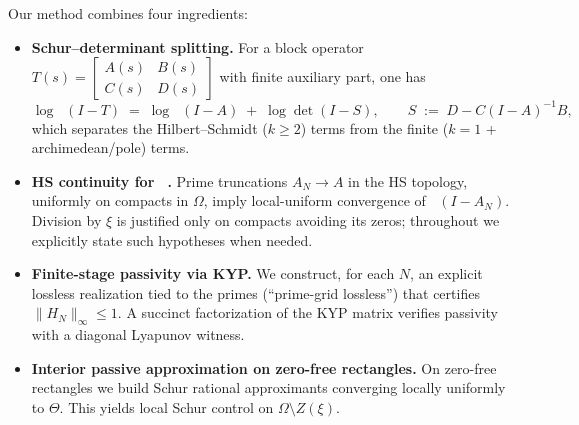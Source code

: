 \documentclass[11pt]{article}
\theoremstyle{remark}
\DeclareMathOperator{\dettwo}{det_2}
\begin{document}
Our method combines four ingredients:
\begin{itemize}
 \item \textbf{Schur--determinant splitting.} For a block operator \(T(s)=\begin{bmatrix}A(s)&B(s)\\ C(s)&D(s)\end{bmatrix}\) with finite auxiliary part, one has
 \[
  \log\dettwo(I-T)\;=\;\log\dettwo(I-A)\; +\; \log\det(I-S),\qquad S\;:=\;D-C(I-A)^{-1}B,
 \]
 which separates the Hilbert--Schmidt (\(k\ge 2\)) terms from the finite (\(k=1\) + archimedean/pole) terms.
 \item \textbf{HS continuity for \(\dettwo\).} Prime truncations \(A_N\to A\) in the HS topology, uniformly on compacts in \(\Omega\), imply local-uniform convergence of \(\dettwo(I-A_N)\). Division by \(\xi\) is justified only on compacts avoiding its zeros; throughout we explicitly state such hypotheses when needed.
 \item \textbf{Finite-stage passivity via KYP.} We construct, for each \(N\), an explicit lossless realization tied to the primes (``prime-grid lossless'') that certifies \(\|H_N\|_\infty\le 1\). A succinct factorization of the KYP matrix verifies passivity with a diagonal Lyapunov witness.
 \item \textbf{Interior passive approximation on zero-free rectangles.} On zero-free rectangles we build Schur rational approximants converging locally uniformly to \(\Theta\). This yields local Schur control on \(\Omega\setminus Z(\xi)\).
\end{itemize}
\end{document}
